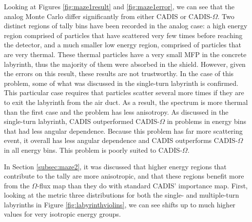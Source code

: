 Looking at Figures \ref{fig:maze1result} and \ref{fig:maze1error}, we can see
that the analog Monte Carlo differ significantly from either CADIS or
CADIS-$\Omega$. Two distinct regions of tally bins have been recorded in the
analog case: a high energy region comprised of particles that have scattered
very few times before reaching the detector, and a much smaller low energy
region, comprised of particles that are very thermal. These thermal particles
have a very small MFP in the concrete labyrinth, thus the majority of them were
absorbed in the shield. However, given the errors on this result, these results are
not trustworthy. In the case of this problem, some of what was discussed in the
single-turn labyrinth is confirmed. This particular case requires that particles
scatter several more times if they are to exit the labyrinth from the air duct.
As a result, the spectrum is more thermal than the first case and the problem
has less anisotropy. As discussed in the single-turn labyrinth, CADIS
outperformed CADIS-$\Omega$ in problems in energy bins that had less angular
dependence. Because this problem has far more scattering event, it overall has
less angular dependence and CADIS outperforms CADIS-$\Omega$ in all energy bins.
This problem is poorly suited to CADIS-$\Omega$.

In Section \ref{subsec:maze2}, it was discussed that higher energy regions that
contribute to the tally are more anisotropic, and that these regions benefit
more from the $\Omega$-flux map than they do with standard CADIS' importance
map. First, looking at the metric three distributions for both the single- and
multiple-turn labyrinths in Figure \ref{fig:labyrinthviolins}, we can see shifts
up to much higher values for very isotropic energy groups.

